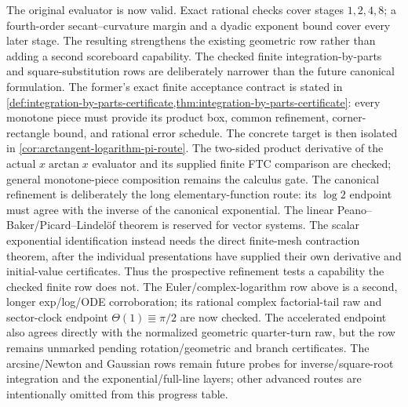 The original  evaluator is now valid.  Exact rational
checks cover stages \(1,2,4,8\); a fourth-order secant--curvature margin and a
dyadic exponent bound cover every later stage.  The resulting
 strengthens the
existing geometric row rather than adding a second scoreboard capability.
The checked finite integration-by-parts and square-substitution rows are
deliberately narrower than the future canonical formulation.  The former's
exact finite acceptance contract is stated in
\cref{def:integration-by-parts-certificate,thm:integration-by-parts-certificate}:
every monotone piece must provide its product box, common refinement,
corner-rectangle bound, and rational error schedule.  The concrete target is
then isolated in \cref{cor:arctangent-logarithm-pi-route}.  The two-sided product derivative
of the actual \(x\arctan x\) evaluator and its supplied finite FTC comparison
are checked; general monotone-piece composition remains the calculus gate.
The canonical refinement is deliberately the long elementary-function route:
its \(\log 2\) endpoint must agree with the inverse
of the canonical exponential.  The linear Peano--Baker/Picard--Lindel\"of
theorem is reserved for vector systems.  The scalar exponential
identification instead needs the direct finite-mesh contraction theorem, after
the individual presentations have supplied their own derivative and
initial-value certificates.  Thus the prospective refinement tests a
capability the checked finite row does not.
The Euler/complex-logarithm row above is a second, longer exp/log/ODE
corroboration; its rational complex factorial-tail raw and sector-clock
endpoint \(\Theta(1)\Equiv\pi/2\) are now checked.  The accelerated endpoint
also agrees directly with the normalized geometric quarter-turn raw, but the
row remains unmarked pending rotation/geometric and branch certificates.  The
arcsine/Newton and Gaussian rows remain future probes for
inverse/square-root integration and the exponential/full-line layers; other
advanced routes are intentionally omitted from this progress table.

